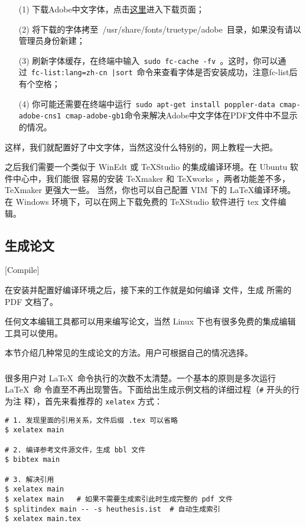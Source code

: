 \begin{enumerate}
\item[(1)] 下载Adobe中文字体，点击\href{http://forum.ubuntu.org.cn/viewtopic.php?f=35&t=180987&start=0}{这里}进入下载页面；
\item[(2)] 将下载的字体拷至~{/usr/share/fonts/truetype/adobe}~目录，如果没有请以管理员身份新建；
\item[(3)] 刷新字体缓存，在终端中输入~\texttt{sudo fc-cache -fv }。这时，你可以通过~\texttt{fc-list:lang=zh-cn |sort}~命令来查看字体是否安装成功，注意fc-list后有个空格；
\item[(4)] 你可能还需要在终端中运行~\texttt{sudo apt-get install poppler-data cmap-adobe-cns1 cmap-adobe-gb1}命令来解决Adobe中文字体在PDF文件中不显示的情况。
\end{enumerate}

这样，我们就配置好了中文字体，当然这没什么特别的，网上教程一大把。

之后我们需要一个类似于 WinEdt 或 TeXStudio 的集成编译环境。在 Ubuntu 软件中心中，我们能很
容易的安装 \TeX{}maker 和 \TeX{}works ，两者功能差不多， \TeX{}maker 更强大一些。
当然，你也可以自己配置 VIM 下的 \LaTeX{}编译环境。在 Windows 环境下，可以在网上下载免费的
TeXStudio 软件进行 tex 文件编辑。

\subsection{生成论文}[Compile]
\label{sec:generate-thesis}

在安装并配置好编译环境之后，接下来的工作就是如何编译 \XeLaTeX{} 文件，生成
所需的 PDF 文档了。

任何文本编辑工具都可以用来编写论文，当然 Linux 下也有很多免费的集成编辑工具可以使用。

本节介绍几种常见的生成论文的方法。用户可根据自己的情况选择。

\subsubsection{\XeLaTeX}
\label{sec:xelatex}
很多用户对 \LaTeX\ 命令执行的次数不太清楚。一个基本的原则是多次运行 \LaTeX\ 命
令直至不再出现警告。下面给出生成示例文档的详细过程（\texttt{\#} 开头的行为注
释），首先来看推荐的 \texttt{xelatex} 方式：
\begin{lstlisting}
# 1. 发现里面的引用关系，文件后缀 .tex 可以省略
$ xelatex main

# 2. 编译参考文件源文件，生成 bbl 文件
$ bibtex main

# 3. 解决引用
$ xelatex main
$ xelatex main   # 如果不需要生成索引此时生成完整的 pdf 文件
$ splitindex main -- -s heuthesis.ist  # 自动生成索引
$ xelatex main.tex
\end{lstlisting}

